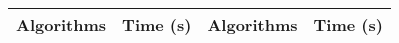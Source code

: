 \begin{figure}[]
\center
\begin{tabular}{|c | c || c | c |}
  \hline
   \textsf{{\textbf{Algorithms}}} &  \textsf{{\textbf{Time (s)}}} & \textsf{{\textbf{Algorithms}}} &  \textsf{{\textbf{Time (s)}}}  \\

\hline
\hline
%
%
%
% 
%
%
%
%




\end{tabular}
\end{figure}
